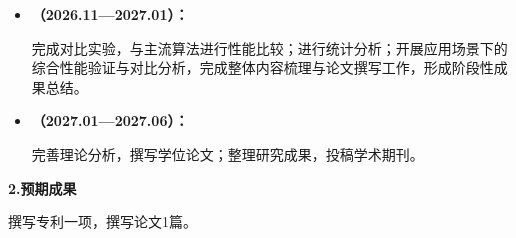 \begin{titlepage}
\begin{itemize}
实验1：消融实验完整验证：验证RL调整α、三层门控、变量筛选的独立贡献

实验2：不同RL方法性能对比：对比DQN、DoubleDQN、DuelingDQN、PPO、A2C与轻量级RL；评估参数量、训练时间、内存占用

实验3：动态惩罚α调整效果验证：
对比固定α vs RL动态调整；分析收敛速度和解质量

实验4：三层门控机制效果验证
对比无门控 vs 单层门控 vs 三层门控；量化通信成本降低程度

实验5：变量重要性筛选效果验证
对比全变量协商 vs Top-k筛选；分析不同筛选率的影响

实验6：参数自适应调整综合验证：验证RL同时调整多参数的效果：对比单参数调整 vs 多参数协同调整

阶段二：高维与新基准测试

扩展实验1：更高维度测试，验证算法在高维问题上的可扩展性

扩展实验2：新基准函数测试（CEC2024）   
    \item \textbf{（2026.11—2027.01）：}
\par
\indent   
完成对比实验，与主流算法进行性能比较；进行统计分析；开展应用场景下的综合性能验证与对比分析，完成整体内容梳理与论文撰写工作，形成阶段性成果总结。
    \item \textbf{（2027.01—2027.06）：}
    \par
\indent  
   完善理论分析，撰写学位论文；整理研究成果，投稿学术期刊。
\end{itemize}

 \noindent
 \textbf{2.预期成果}
 \par
\indent  
撰写专利一项，撰写论文1篇。
\end{titlepage}
